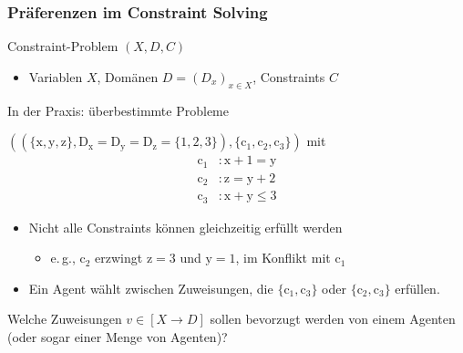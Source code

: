 \documentclass[10pt,xcolor={dvipsnames},fleqn]{beamer}
\newcommand{\cemph}[1]{\alert{#1}}
\begin{document}
\begin{frame}
\frametitle{Präferenzen im Constraint Solving}

Constraint-Problem $(X, D, C)$ 
\begin{itemize}
  \item \cemph{Variablen} $X$,
\cemph{Domänen} $D = (D_x)_{x \in X}$,
\cemph{Constraints} $C$
\end{itemize}

\vspace*{1ex}

In der Praxis: \cemph{überbestimmte} Probleme

\vspace*{2ex}

$((\{ \mathrm{x}, \mathrm{y}, \mathrm{z} \},
\mathrm{D}_{\mathrm{x}} = \mathrm{D}_{\mathrm{y}} =
\mathrm{D}_{\mathrm{z}} = \{ 1, 2, 3 \}), \{ \mathrm{c}_1,
\mathrm{c}_2, \mathrm{c}_3 \})$ mit 
\bgroup{}
\begin{align*}
  \mathrm{c}_1 &: \mathrm{x} + 1 = \mathrm{y}
\\[-.4ex]
  \mathrm{c}_2 &: \mathrm{z} = \mathrm{y} + 2
\\[-.4ex]
  \mathrm{c}_3 &: \mathrm{x} + \mathrm{y} \leq 3
\end{align*}
\egroup

\begin{itemize}
  \item Nicht alle Constraints können gleichzeitig erfüllt werden
\begin{itemize} \pause
  \item e.\,g., $\mathrm{c}_2$ erzwingt $\mathrm{z} = 3$ und $\mathrm{y} = 1$, im Konflikt mit $\mathrm{c}_1$
\end{itemize}

  \item Ein Agent \cemph{wählt} zwischen Zuweisungen, die $\{ \mathrm{c}_1, \mathrm{c}_3 \}$ oder $\{ \mathrm{c}_2, \mathrm{c}_3 \}$ erfüllen.
\end{itemize}

\vspace*{2ex}

Welche Zuweisungen $v \in [X \to D]$ sollen \alert{bevorzugt} werden von einem Agenten (oder sogar einer Menge von Agenten)?

\end{frame}
\end{document}
